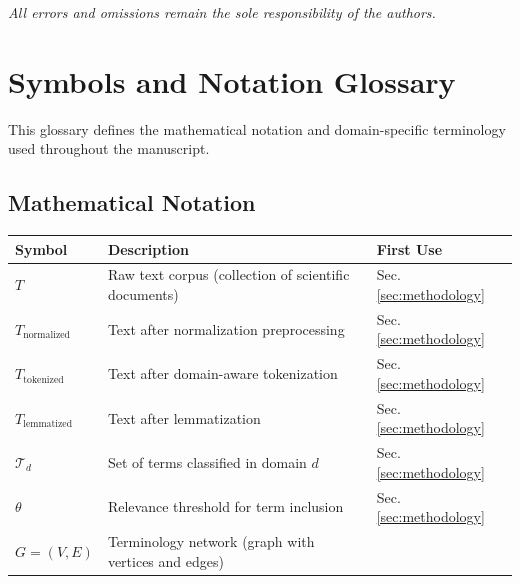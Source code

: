 \documentclass[
]{article}
\newcounter{none} %
\numberwithin{equation}{section}
\begin{document}
\emph{All errors and omissions remain the sole responsibility of the
authors.}

\newpage

\section{Symbols and Notation Glossary}\label{sec:glossary}

This glossary defines the mathematical notation and domain-specific
terminology used throughout the manuscript.

\subsection{Mathematical Notation}\label{mathematical-notation}

{\def\LTcaptype{none} %
\begin{longtable}[]{@{}
  >{\raggedright\arraybackslash}p{}
  >{\raggedright\arraybackslash}p{}
  >{\raggedright\arraybackslash}p{}@{}}
\toprule\noalign{}
\begin{minipage}[b]{\linewidth}\raggedright
Symbol
\end{minipage} & \begin{minipage}[b]{\linewidth}\raggedright
Description
\end{minipage} & \begin{minipage}[b]{\linewidth}\raggedright
First Use
\end{minipage} \\
\midrule\noalign{}
\endhead
\bottomrule\noalign{}
\endlastfoot
\(T\) & Raw text corpus (collection of scientific documents) & Sec.
\ref{sec:methodology} \\
\(T_{\text{normalized}}\) & Text after normalization preprocessing &
Sec. \ref{sec:methodology} \\
\(T_{\text{tokenized}}\) & Text after domain-aware tokenization & Sec.
\ref{sec:methodology} \\
\(T_{\text{lemmatized}}\) & Text after lemmatization & Sec.
\ref{sec:methodology} \\
\(\mathcal{T}_d\) & Set of terms classified in domain \(d\) & Sec.
\ref{sec:methodology} \\
\(\theta\) & Relevance threshold for term inclusion & Sec.
\ref{sec:methodology} \\
\(G = (V, E)\) & Terminology network (graph with vertices and edges) &

\end{longtable}}
\end{document}
